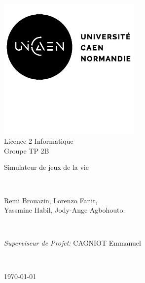 \documentclass{article}
\begin{document}
    
    \begin{titlepage}      
        \begin{center}
            \includegraphics[width=7cm]{figures/logoUNICAEN.png}\\[0.5cm]
            {\LARGE Licence 2 Informatique\\[0.5cm]
            Groupe TP 2B}\\[1cm]

            \linespread{1.2}\huge {
            
                Simulateur de jeux de la vie
            
            }
            \linespread{1}~\\[1cm]
            {\Large 

                Remi Brouazin,\hspace{0.1in} Lorenzo Fanit, \hspace{0.1in} \\Yassmine Habil,\hspace{0.1in} Jody-Ange Agbohouto.
            }\\[1cm] 
            

            {\large 
         
                \emph{Superviseur de Projet:} CAGNIOT Emmanuel}\\[1cm] %

            \large 

            \vfill
            
            
            \today %
        \end{center}
    \end{titlepage}
    
    
    \newpage
    \thispagestyle{empty}
     
\end{document}
